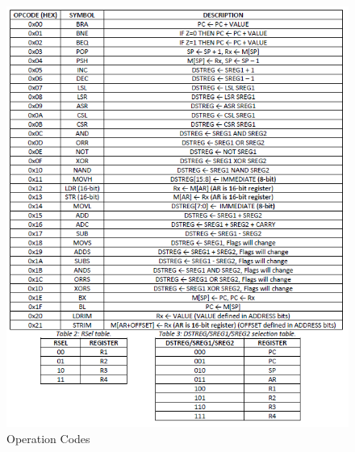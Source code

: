\documentclass[pdftex,12pt,a4paper]{article}
\begin{document}
	\begin{figure}[H]
		\centering
		\includegraphics[width=1.0\textwidth]{OPCODES.png}
		\caption{Operation Codes}
		\label{fig:Operation Codes}
	\end{figure}
	\newpage
\end{document}

